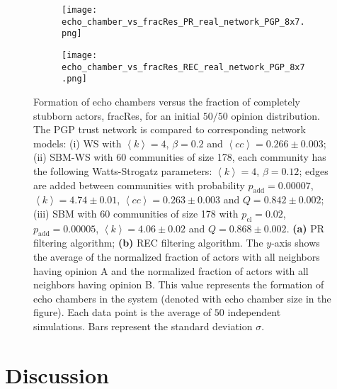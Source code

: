 \documentclass[11 pt , letterpaper , twoside , openright]{book}
\begin{document}
\begin{figure}[H]
  \begin{subfigure}[b]{0.49\textwidth}
    \caption{}
  	\texttt{[image: echo\_chamber\_vs\_fracRes\_PR\_real\_network\_PGP\_8x7.png]}
    \label{pr_real_PGP}
  \end{subfigure}
  \begin{subfigure}[b]{0.49\textwidth}
    \caption{}
  	\texttt{[image: echo\_chamber\_vs\_fracRes\_REC\_real\_network\_PGP\_8x7.png]}
    \label{rec_real_PGP}
  \end{subfigure}
  \captionsetup{format=plain}
  \caption[Formation of echo chambers versus fraction of completely stubborn actors for the PR and REC filtering algorithms and an initial $50/50$ opinion distribution. The PGP trust network is compared to corresponding network models.]{Formation of echo chambers versus the fraction of completely stubborn actors, fracRes, for an initial $50/50$ opinion distribution. The PGP trust network is compared to corresponding network models: (i) WS with $\left<k\right> = 4$, $\beta = 0.2$ and $\left<cc\right> = 0.266 \pm 0.003$; (ii) SBM-WS with 60 communities of size 178, each community has the following Watts-Strogatz parameters: $\left<k\right> = 4$, $\beta = 0.12$; edges are added between communities with probability $p_\text{add} = 0.00007$, $\left<k\right> = 4.74 \pm 0.01$, $\left<cc\right> = 0.263 \pm 0.003$ and $Q = 0.842 \pm 0.002$; (iii) SBM with 60 communities of size 178 with $p_\text{cl} = 0.02$, $p_\text{add} = 0.00005$, $\left<k\right> = 4.06 \pm 0.02$ and $Q = 0.868 \pm 0.002$. \textbf{(a)} PR filtering algorithm; \textbf{(b)} REC filtering algorithm. The $y$-axis shows the average of the normalized fraction of actors with all neighbors having opinion A and the normalized fraction of actors with all neighbors having opinion B. This value represents the formation of echo chambers in the system (denoted with echo chamber size in the figure). Each data point is the average of $50$ independent simulations. Bars represent the standard deviation $\sigma$.}
\label{echo_vs_fracRes_real_PGP}
\end{figure}

\chapter{Discussion}
\end{document}
